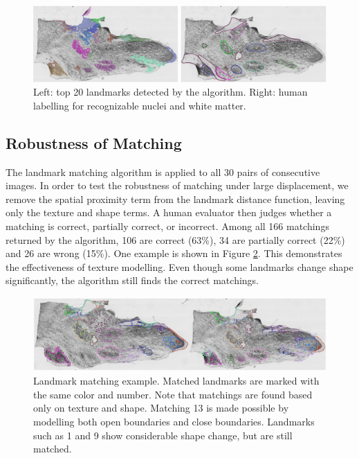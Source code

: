 \documentclass{llncs}
\begin{document}
\begin{figure}
	\includegraphics[width=\textwidth]{../figures/CompareHuman.png}
	\caption{Left: top 20 landmarks detected by the algorithm. Right: human labelling for recognizable nuclei and white matter.}
	\label{fig:TopRegions}
\end{figure}


\subsection{Robustness of Matching}

The landmark matching algorithm is applied to all 30 pairs of consecutive images. In order to test the robustness of matching under large displacement, we remove the spatial proximity term from the landmark distance function, leaving only the texture and shape terms. A human evaluator then judges whether a matching is correct, partially correct, or incorrect. Among all 166 matchings returned by the algorithm, 106 are correct (63\%), 34 are partially correct (22\%) and 26 are wrong (15\%). One example is shown in Figure \ref{fig:LandmarkMatch}. This demonstrates the effectiveness of texture modelling. Even though some landmarks change shape significantly, the algorithm still finds the correct matchings.

\begin{figure}
	\includegraphics[width=\textwidth]{../figures/MatchingHorizontal.png}
	\caption{Landmark matching example. Matched landmarks are marked with the same color and number. Note that matchings are found based only on texture and shape. Matching 13 is made possible by modelling both open boundaries and close boundaries. Landmarks such as 1 and 9 show considerable shape change, but are still matched.}
	\label{fig:LandmarkMatch}
\end{figure}
\end{document}
